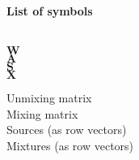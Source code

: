 \documentclass[titlepage,twoside,onecolumn,a4paper,11pt]{report}
\begin{document}
\noindent
\textbf{List of symbols}\\ \\
\begin{minipage}{0.2\linewidth}
	$\textbf{W}$\\
	$\textbf{A}$\\
	$\textbf{S}$\\
	$\textbf{X}$\\


\end{minipage}
\begin{minipage}{0.6\linewidth}
    Unmixing matrix\\
    Mixing matrix\\
    Sources (as row vectors)\\
    Mixtures (as row vectors)\\

\end{minipage}
\cleardoublepage
\fancyhead[RE]{\leftmark}		%
\fancyhead[LO]{\rightmark}





\cleardoublepage %
\fancyhead[RE]{\leftmark}
\fancyhead[LO]{\rightmark}



\cleardoublepage %
\fancyhead[RE]{\leftmark}
\fancyhead[LO]{\rightmark}



\cleardoublepage %
\fancyhead[RE]{\leftmark}
\fancyhead[LO]{\rightmark}



\cleardoublepage %
\fancyhead[RE]{\leftmark}
\fancyhead[LO]{\rightmark}



\cleardoublepage %
\fancyhead[RE]{\leftmark}
\fancyhead[LO]{\rightmark}



\cleardoublepage %
\fancyhead[RO,LE]{\thepage}
\end{document}
